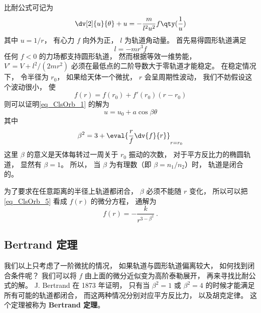 

比耐公式可记为
\begin{equation}\label{eq_ClsOrb_1}
\dv[2]{u}{\theta} + u = -\frac{m}{l^2 u^2} f\qty(\frac 1u)
\end{equation}
其中 $u = 1/r$， 有心力 $f$ 向外为正， $l$ 为轨道角动量。 首先易得圆形轨道满足
\begin{equation}
l = - m r^3 f
\end{equation}
任何 $f < 0$ 的力场都支持圆形轨道， 然而根据等效一维势能， $V' = V + l^2/(2mr^2)$ 必须在最低点的二阶导数大于零轨道才能稳定。 在稳定情况下， 令半径为 $r_0$， 如果给天体一个微扰， $r$ 会呈周期性波动， 我们不妨假设这个波动很小， 使
\begin{equation}
f(r) = f(r_0) + f'(r_0)(r-r_0)
\end{equation}
则可以证明\autoref{eq_ClsOrb_1} 的解为
\begin{equation}
u = u_0 + a\cos\beta\theta
\end{equation}
其中
\begin{equation}\label{eq_ClsOrb_5}
\beta^2 = 3 + \eval{\frac rf \dv{f}{r}}_{r = r_0}
\end{equation}
这里 $\beta$ 的意义是天体每转过一周关于 $r_0$ 振动的次数， 对于平方反比力的椭圆轨道， 显然有 $\beta = 1$。 所以， 当 $\beta$ 为有理数（即 $\beta = n_1/n_2$）时， 轨道是闭合的。

为了要求在任意距离的半径上轨道都闭合，  $\beta$ 必须不能随 $r$ 变化， 所以可以把\autoref{eq_ClsOrb_5} 看成 $f(r)$ 的微分方程， 通解为
\begin{equation}
f(r) = - \frac{k}{r^{3-\beta^2}}~.
\end{equation}

\subsection{Bertrand 定理}
我们以上只考虑了一阶微扰的情况， 如果轨道与圆形轨道偏离较大， 如何找到闭合条件呢？ 我们可以将 $f$ 由上面的微分近似变为高阶泰勒展开， 再来寻找比耐公式的解。 J. Bertrand 在 1873 年证明， 只有当 $\beta^2 = 1$ 或 $\beta^2 = 4$ 的时候才能满足所有可能的轨道都闭合， 而这两种情况分别对应平方反比力， 以及胡克定律。 这个定理被称为 \textbf{Bertrand 定理}。